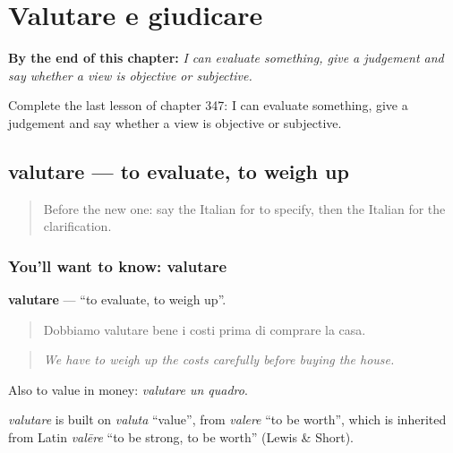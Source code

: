 
\chapter{Valutare e giudicare}
\label{ch:it-valutare-e-giudicare}

\begin{chapteropening}
\textbf{By the end of this chapter:} \emph{I can evaluate something, give a judgement and say whether a view is objective or subjective.}

Complete the last lesson of chapter 347: I can evaluate something, give a judgement and say whether a view is objective or subjective.
\end{chapteropening}

\section[valutare]{valutare — to evaluate, to weigh up}

\label{lesson:IT-C347-valutare}



\begin{quote}
Before the new one: say the Italian for to specify, then the Italian for the clarification.
\end{quote}

\subsection*{You'll want to know: valutare}
\textbf{valutare} — \textquotedblleft{}to evaluate, to weigh up\textquotedblright{}.

\begin{quote}
Dobbiamo valutare bene i costi prima di comprare la casa.
\end{quote}

\begin{quote}
\emph{We have to weigh up the costs carefully before buying the house.}
\end{quote}

Also to value in money: \emph{valutare un quadro}.

\begin{cousinweb}
\emph{valutare} is built on \emph{valuta} \textquotedblleft{}value\textquotedblright{}, from \emph{valere} \textquotedblleft{}to be worth\textquotedblright{}, which is inherited from Latin \emph{valēre} \textquotedblleft{}to be strong, to be worth\textquotedblright{} (Lewis \& Short).
\end{cousinweb}

